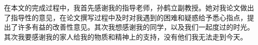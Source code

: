 % 
在本文的完成过程中，我首先感谢我的指导老师，孙鹤立副教授。她对我论文做出了指导性的意见，在论文撰写过程中及时对我遇到的困难和疑惑给予悉心指点，提出了许多有益的改善性意见。其次我想感谢我的同学，以及我们一起度过的时光。其次我要感谢我的家人给我的物质和精神上的支持，没有他们我无法走到今天。
% 
